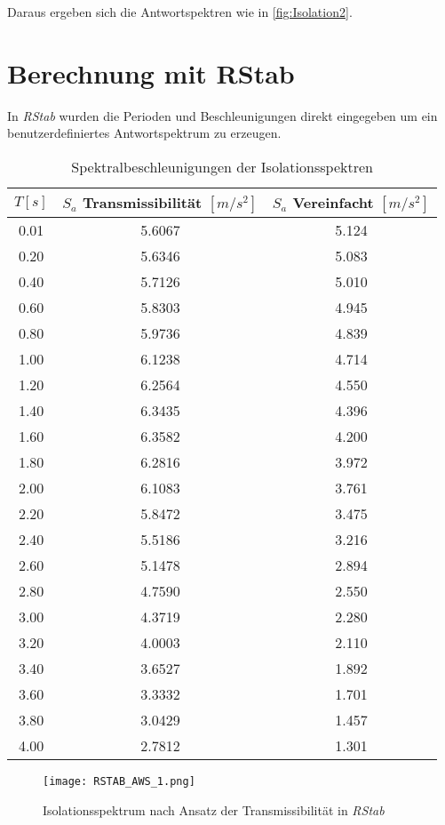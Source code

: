 Daraus ergeben sich die Antwortspektren wie in \cref{fig:Isolation2}.

\pagebreak

\section{Berechnung mit RStab}
\label{sec:rstab}

In \emph{RStab} wurden die Perioden und Beschleunigungen direkt eingegeben um ein benutzerdefiniertes Antwortspektrum zu erzeugen.

\begin{table}[H]
\centering
\begin{tabular}{ |c|c|c| } 
 \hline
 $T [s]$ & $S_a$ Transmissibilität $[m/s^2]$ & $S_a$ Vereinfacht $[m/s^2]$\\
 \hline\hline
0.01 & 5.6067 & 5.124\\
0.20 & 5.6346 & 5.083\\
0.40 & 5.7126 & 5.010\\
0.60 & 5.8303 & 4.945\\
0.80 & 5.9736 & 4.839\\
1.00 & 6.1238 & 4.714\\
1.20 & 6.2564 & 4.550\\
1.40 & 6.3435 & 4.396\\
1.60 & 6.3582 & 4.200\\
1.80 & 6.2816 & 3.972\\
2.00 & 6.1083 & 3.761\\
2.20 & 5.8472 & 3.475\\
2.40 & 5.5186 & 3.216\\
2.60 & 5.1478 & 2.894\\
2.80 & 4.7590 & 2.550\\
3.00 & 4.3719 & 2.280\\
3.20 & 4.0003 & 2.110\\
3.40 & 3.6527 & 1.892\\
3.60 & 3.3332 & 1.701\\
3.80 & 3.0429 & 1.457\\
4.00 & 2.7812 & 1.301\\
 \hline
\end{tabular}
\caption{Spektralbeschleunigungen der Isolationsspektren}
\end{table}

\pagebreak

\begin{figure}[H]
    \centering
    \texttt{[image: RSTAB\_AWS\_1.png]}
    \caption{Isolationsspektrum nach Ansatz der Transmissibilität in \emph{RStab}}
\end{figure}

